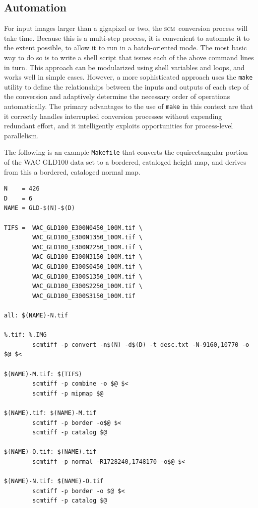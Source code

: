 \documentclass[oneside,10pt]{memoir}
\newcommand{\scm}     {\textsc{scm}}
\begin{document}
\begin{Spacing}{1.1}
\subsection{Automation}

For input images larger than a gigapixel or two, the \scm\ conversion process will take time. Because this is a multi-step process, it is convenient to automate it to the extent possible, to allow it to run in a batch-oriented mode. The most basic way to do so is to write a shell script that issues each of the above command lines in turn. This approach can be modularized using shell variables and loops, and works well in simple cases. However, a more sophisticated approach uses the \texttt{make} utility to define the relationships between the inputs and outputs of each step of the conversion and adaptively determine the necessary order of operations automatically. The primary advantages to the use of \texttt{make} in this context are that it correctly handles interrupted conversion processes without expending redundant effort, and it intelligently exploits opportunities for process-level parallelism.

The following is an example \texttt{Makefile} that converts the equirectangular portion of the WAC GLD100 data set to a bordered, cataloged height map, and derives from this a bordered, cataloged normal map.

\begin{Verbatim}
N    = 426
D    = 6
NAME = GLD-$(N)-$(D)

TIFS =  WAC_GLD100_E300N0450_100M.tif \
        WAC_GLD100_E300N1350_100M.tif \
        WAC_GLD100_E300N2250_100M.tif \
        WAC_GLD100_E300N3150_100M.tif \
        WAC_GLD100_E300S0450_100M.tif \
        WAC_GLD100_E300S1350_100M.tif \
        WAC_GLD100_E300S2250_100M.tif \
        WAC_GLD100_E300S3150_100M.tif

all: $(NAME)-N.tif

%.tif: %.IMG
        scmtiff -p convert -n$(N) -d$(D) -t desc.txt -N-9160,10770 -o $@ $<

$(NAME)-M.tif: $(TIFS)
        scmtiff -p combine -o $@ $<
        scmtiff -p mipmap $@

$(NAME).tif: $(NAME)-M.tif
        scmtiff -p border -o$@ $<
        scmtiff -p catalog $@

$(NAME)-O.tif: $(NAME).tif
        scmtiff -p normal -R1728240,1748170 -o$@ $<

$(NAME)-N.tif: $(NAME)-O.tif
        scmtiff -p border -o $@ $<
        scmtiff -p catalog $@
\end{Verbatim}


\end{Spacing}
\end{document}
